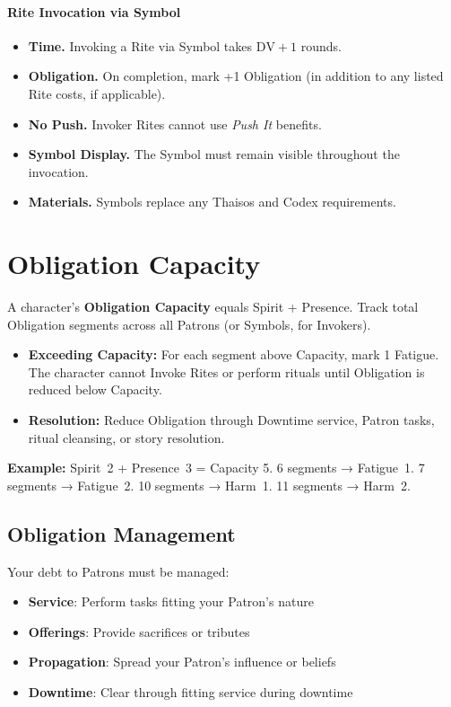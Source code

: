\paragraph{Rite Invocation via Symbol}
\begin{itemize}
  \item \textbf{Time.} Invoking a Rite via Symbol takes \(\text{DV} + 1\) rounds.
  \item \textbf{Obligation.} On completion, mark +1 Obligation (in addition to any listed Rite costs, if applicable).
  \item \textbf{No Push.} Invoker Rites cannot use \emph{Push It} benefits.
  \item \textbf{Symbol Display.} The Symbol must remain visible throughout the invocation.
  \item \textbf{Materials.} Symbols replace any Thaisos and Codex requirements.
\end{itemize}
\section{Obligation Capacity}

A character’s \textbf{Obligation Capacity} equals Spirit + Presence.  
Track total Obligation segments across all Patrons (or Symbols, for Invokers).

\begin{itemize}
  \item \textbf{Exceeding Capacity:} For each segment above Capacity, mark 1 Fatigue. The character cannot Invoke Rites or perform rituals until Obligation is reduced below Capacity.
  \item \textbf{Resolution:} Reduce Obligation through Downtime service, Patron tasks, ritual cleansing, or story resolution.
\end{itemize}

\textbf{Example:} Spirit~2 + Presence~3 = Capacity 5.  
6 segments → Fatigue~1.  
7 segments → Fatigue~2.  
10 segments → Harm~1.  
11 segments → Harm~2.

\subsection*{Obligation Management}
Your debt to Patrons must be managed:
\begin{itemize}
\item \textbf{Service}: Perform tasks fitting your Patron's nature
\item \textbf{Offerings}: Provide sacrifices or tributes
\item \textbf{Propagation}: Spread your Patron's influence or beliefs
\item \textbf{Downtime}: Clear through fitting service during downtime
\end{itemize}

